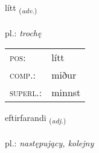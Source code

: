 \documentclass[frontgrid, backgrid]{flacards}\usepackage[]{graphicx}\usepackage[]{xcolor}
\begin{document}
\renewcommand{\flhead}{\vskip5pt \fboxsep=0pt {\small\bfseries\footnotesize Atviksorð | przysłówek}}
\renewcommand{\fcfoot}{\vskip5pt \fboxsep=0pt \hspace{2pt}{\small\bfseries\footnotesize 1K}}

\renewcommand{\blhead}{\vskip5pt {\small\bfseries\footnotesize Atviksorð | przysłówek }}
\renewcommand{\bcfoot}{\vskip5pt \hspace{2pt}{\small\bfseries\footnotesize 1K}}


{lítt \small{\textsubscript{(\textit{adv.})}} \\[1ex] %
\textphonetic{[liht]} \\
pl.: \emph{trochę} \\  [2ex]
\renewcommand*{\arraystretch}{0.8}
\begin{tabular}{ll}
\textsc{pos}: & lítt \\ 
\textsc{comp.}: & miður \\ 
\textsc{superl.}: & minnst \\
\end{tabular}
}

\renewcommand{\flhead}{\vskip5pt \fboxsep=0pt {\small\bfseries\footnotesize Lýsingarorð | przymiotnik}}
\renewcommand{\fcfoot}{\vskip5pt \fboxsep=0pt \hspace{2pt}{\small\bfseries\footnotesize 1K}}

\renewcommand{\blhead}{\vskip5pt {\small\bfseries\footnotesize Lýsingarorð | przymiotnik }}
\renewcommand{\bcfoot}{\vskip5pt \hspace{2pt}{\small\bfseries\footnotesize 1K}}


{eftirfarandi \small{\textsubscript{(\textit{adj.})}} \\[1ex] %
 \\
pl.: \emph{następujący, kolejny} \\  [2ex]
\renewcommand*{\arraystretch}{0.8}
}
\end{document}
